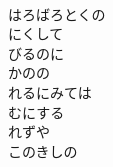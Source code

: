\documentclass[10pt,b5j]{tarticle} %
\begin{document}
\begin{enumerate}
\begin{minipage}[c]{\blocksize}
        \vspace{\linespace}
        \item~\\
        はろばろとくの\\
        にくして\\
        びるのに\\
        かのの\\
        れるにみては\\
        むにする\\
        れずや\\
        このきしの
    
    \end{minipage}
\end{enumerate} %
\end{document}
